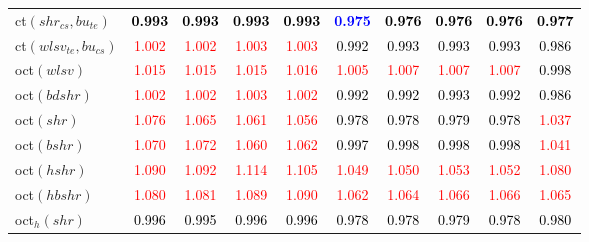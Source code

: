 \begin{tabular}[t]{l|ccccccccc}
ct$(shr_{cs}, bu_{te})$ & \textcolor{black}{\textbf{0.993}} & \textcolor{black}{\textbf{0.993}} & \textcolor{black}{\textbf{0.993}} & \textcolor{black}{\textbf{0.993}} & \textcolor{blue}{\textbf{0.975}} & \textcolor{black}{\textbf{0.976}} & \textcolor{black}{\textbf{0.976}} & \textcolor{black}{\textbf{0.976}} & \textcolor{black}{\textbf{0.977}}\\
ct$(wlsv_{te}, bu_{cs})$ & \textcolor{red}{1.002} & \textcolor{red}{1.002} & \textcolor{red}{1.003} & \textcolor{red}{1.003} & \textcolor{black}{0.992} & \textcolor{black}{0.993} & \textcolor{black}{0.993} & \textcolor{black}{0.993} & \textcolor{black}{0.986}\\
oct$(wlsv)$ & \textcolor{red}{1.015} & \textcolor{red}{1.015} & \textcolor{red}{1.015} & \textcolor{red}{1.016} & \textcolor{red}{1.005} & \textcolor{red}{1.007} & \textcolor{red}{1.007} & \textcolor{red}{1.007} & \textcolor{black}{0.998}\\
oct$(bdshr)$ & \textcolor{red}{1.002} & \textcolor{red}{1.002} & \textcolor{red}{1.003} & \textcolor{red}{1.002} & \textcolor{black}{0.992} & \textcolor{black}{0.992} & \textcolor{black}{0.993} & \textcolor{black}{0.992} & \textcolor{black}{0.986}\\
oct$(shr)$ & \textcolor{red}{1.076} & \textcolor{red}{1.065} & \textcolor{red}{1.061} & \textcolor{red}{1.056} & \textcolor{black}{0.978} & \textcolor{black}{0.978} & \textcolor{black}{0.979} & \textcolor{black}{0.978} & \textcolor{red}{1.037}\\
oct$(bshr)$ & \textcolor{red}{1.070} & \textcolor{red}{1.072} & \textcolor{red}{1.060} & \textcolor{red}{1.062} & \textcolor{black}{0.997} & \textcolor{black}{0.998} & \textcolor{black}{0.998} & \textcolor{black}{0.998} & \textcolor{red}{1.041}\\
oct$(hshr)$ & \textcolor{red}{1.090} & \textcolor{red}{1.092} & \textcolor{red}{1.114} & \textcolor{red}{1.105} & \textcolor{red}{1.049} & \textcolor{red}{1.050} & \textcolor{red}{1.053} & \textcolor{red}{1.052} & \textcolor{red}{1.080}\\
oct$(hbshr)$ & \textcolor{red}{1.080} & \textcolor{red}{1.081} & \textcolor{red}{1.089} & \textcolor{red}{1.090} & \textcolor{red}{1.062} & \textcolor{red}{1.064} & \textcolor{red}{1.066} & \textcolor{red}{1.066} & \textcolor{red}{1.065}\\
oct$_h(shr)$ & \textcolor{black}{0.996} & \textcolor{black}{0.995} & \textcolor{black}{0.996} & \textcolor{black}{0.996} & \textcolor{black}{0.978} & \textcolor{black}{0.978} & \textcolor{black}{0.979} & \textcolor{black}{0.978} & \textcolor{black}{0.980}\\

\end{tabular}
